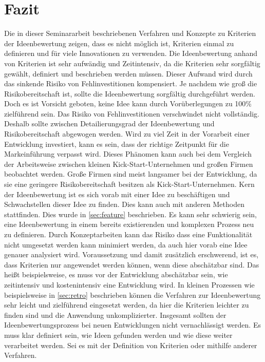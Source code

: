 \section{Fazit}\label{sec:fazit}
Die in dieser Seminararbeit beschriebenen Verfahren und Konzepte zu Kriterien der Ideenbewertung zeigen, dass
es nicht möglich ist, Kriterien einmal zu definieren und für viele Innovationen zu verwenden. Die Ideenbewertung anhand 
von Kriterien ist sehr aufwändig und Zeitintensiv, da die Kriterien sehr sorgfältig gewählt, definiert und beschrieben 
werden müssen. Dieser Aufwand wird durch das sinkende Risiko von Fehlinvestitionen kompensiert. 
Je nachdem wie groß die Risikobereitschaft ist, sollte die Ideenbewertung sorgfältig durchgeführt werden. 
Doch es ist Vorsicht geboten, keine Idee kann durch Vorüberlegungen zu 100\% zielführend sein. Das Risiko von 
Fehlinvestitionen verschwindet nicht vollständig. Deshalb sollte zwischen Detailierungsgrad der Ideenbewertung 
und Risikobereitschaft abgewogen werden. Wird zu viel Zeit in der Vorarbeit einer Entwicklung investiert, kann es sein, dass
der richtige Zeitpunkt für die Markeinführung verpasst wird. Dieses Phänomen kann auch bei dem Vergleich der Arbeitsweise zwischen kleinen 
Kick-Start-Unternehmen und großen Firmen beobachtet werden. Große Firmen sind meist langsamer bei der Entwicklung, da sie eine 
geringere Risikobereitschaft besitzen als Kick-Start-Unternehmen. 
Kern der Ideenbewertung ist es sich vorab mit einer Idee zu beschäftigen und Schwachstellen dieser Idee zu finden. Dies 
kann auch mit anderen Methoden stattfinden. Dies wurde in \autoref{sec:feature} beschrieben. Es kann sehr schwierig sein, 
eine Ideenbewertung in einem bereits existierenden und komplexen Prozess neu zu definieren. Durch Konzeptarbeiten kann 
das Risiko dass eine Funktionalität nicht umgesetzt werden kann minimiert werden, da auch hier vorab eine Idee genauer 
analysiert wird. 
Voraussetzung und damit zusätzlich erschwerend, ist es, dass Kriterien nur angewendet werden können, wenn diese abschätzbar sind. 
Das heißt beispielsweise, es muss vor der Entwicklung abschätzbar sein, wie zeitintensiv und kostenintensiv eine Entwicklung wird. 
In kleinen Prozessen wie beispielsweise in \autoref{sec:retro} beschrieben können die Verfahren zur Ideenbewertung sehr leicht und 
zielführend eingesetzt werden, da hier die Kriterien leichter zu finden sind und die Anwendung unkomplizierter. 
Insgesamt sollten der Ideenbewertungsprozess bei neuen Entwicklungen nicht vernachlässigt werden. Es muss klar definiert sein, wie
Ideen gefunden werden und wie diese weiter verarbeitet werden. Sei es mit der Definition von Kriterien oder mithilfe anderer Verfahren. 
